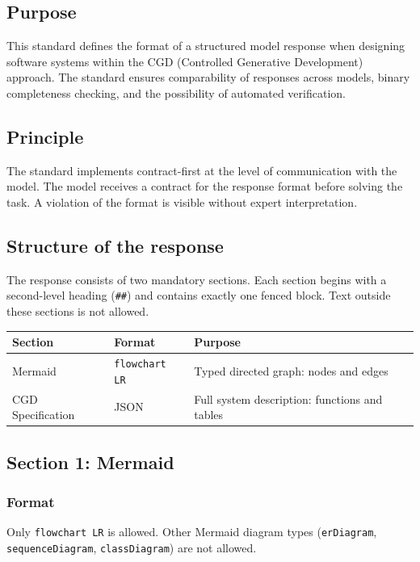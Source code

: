\subsection{Purpose}

This standard defines the format of a structured model response when designing software systems within the CGD (Controlled Generative Development) approach. The standard ensures comparability of responses across models, binary completeness checking, and the possibility of automated verification.

\subsection{Principle}

The standard implements contract-first at the level of communication with the model. The model receives a contract for the response format before solving the task. A violation of the format is visible without expert interpretation.

\subsection{Structure of the response}

The response consists of two mandatory sections. Each section begins with a second-level heading (\texttt{\#\#}) and contains exactly one fenced block. Text outside these sections is not allowed.

\begin{tabular}{lll}
\hline
\textbf{Section} & \textbf{Format} & \textbf{Purpose} \\
\hline
Mermaid & \texttt{flowchart LR} & Typed directed graph: nodes and edges \\
CGD Specification & JSON & Full system description: functions and tables \\
\hline
\end{tabular}

\subsection{Section 1: Mermaid}

\subsubsection{Format}

Only \texttt{flowchart LR} is allowed. Other Mermaid diagram types (\texttt{erDiagram}, \texttt{sequenceDiagram}, \texttt{classDiagram}) are not allowed.

